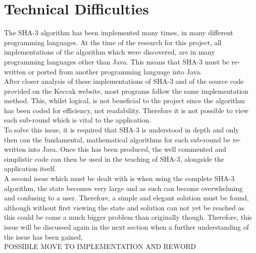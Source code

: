 \section{Technical Difficulties}
The SHA-3 algorithm has been implemented many times, in many different programming languages. At the time of the research for this project, all implementations of the algorithm which were discovered, are in many programming languages other than Java. This means that SHA-3 must be re-written or ported from another programming language into Java. 
\vspace{5 mm}\\
After closer analysis of these implementations of SHA-3 and of the source code provided on the Keccak website\cite{KeccakSite}, most programs follow the same implementation method. This, whilst logical, is not beneficial to the project since the algorithm has been coded for efficiency, not readability. Therefore it is not possible to view each sub-round which is vital to the application.
\vspace{5 mm}\\
To solve this issue, it is required that SHA-3 is understood in depth and only then can the fundamental, mathematical algorithms for each sub-round be re-written into Java. Once this has been produced, the well commented and simplistic code can then be used in the teaching of SHA-3, alongside the application itself.
\vspace{5 mm}\\
A second issue which must be dealt with is when using the complete SHA-3 algorithm, the state becomes very large and as such can become overwhelming and confusing to a user. Therefore, a simple and elegant solution must be found, although without first viewing the state and solution can not yet be reached as this could be come a much bigger problem than originally though. Therefore, this issue will be discussed again in the next section when a further understanding of the issue has been gained.
\vspace{5 mm}\\
POSSIBLE MOVE TO IMPLEMENTATION AND REWORD